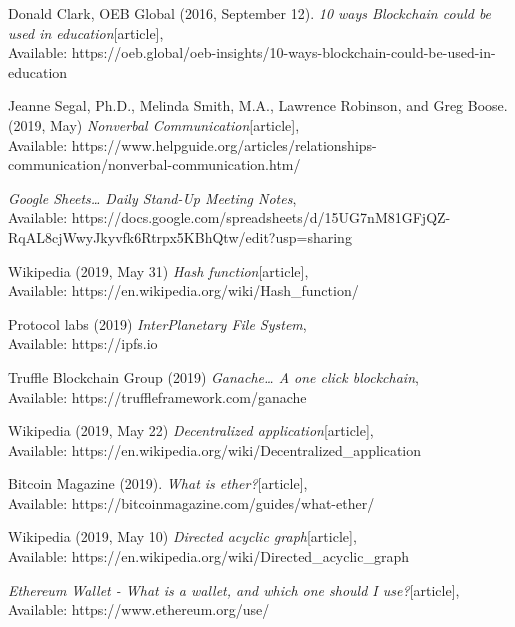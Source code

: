 \begin{thebibliography}{20}
Donald Clark, OEB Global (2016, September 12).
\emph{10 ways Blockchain could be used in education}[article],\\
Available: {https://oeb.global/oeb-insights/10-ways-blockchain-could-be-used-in-education}

  Jeanne Segal, Ph.D., Melinda Smith, M.A., Lawrence Robinson, and Greg Boose. (2019, May)
\emph{Nonverbal Communication}[article],\\
Available: {https://www.helpguide.org/articles/relationships-communication/nonverbal-communication.htm/}

\emph{Google Sheets… Daily Stand-Up Meeting Notes},\\
Available: {https://docs.google.com/spreadsheets/d/15UG7nM81GFjQZ-RqAL8cjWwyJkyvfk6Rtrpx5KBhQtw/edit?usp=sharing}

 Wikipedia (2019, May 31)
\emph{Hash function}[article],\\
Available: {https://en.wikipedia.org/wiki/Hash\_function/}

Protocol labs (2019)
\emph{InterPlanetary File System},\\
Available: {https://ipfs.io}

 Truffle Blockchain Group (2019)
\emph{Ganache… A one click blockchain},\\
Available: {https://truffleframework.com/ganache}

 Wikipedia (2019, May 22)
\emph{Decentralized application}[article],\\
Available: {https://en.wikipedia.org/wiki/Decentralized\_application}

 Bitcoin Magazine (2019).
\emph{What is ether?}[article],\\
Available: {https://bitcoinmagazine.com/guides/what-ether/}

Wikipedia (2019, May 10)
\emph{Directed acyclic graph}[article],\\
Available: {https://en.wikipedia.org/wiki/Directed\_acyclic\_graph}

\emph{Ethereum Wallet - What is a wallet, and which one should I use?}[article],\\
Available: {https://www.ethereum.org/use/}

\end{thebibliography}

